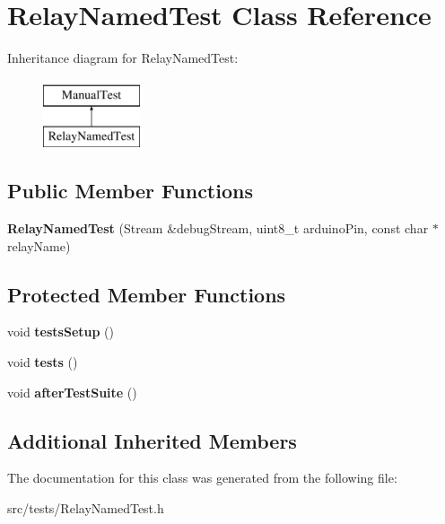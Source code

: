\hypertarget{class_relay_named_test}{}\section{Relay\+Named\+Test Class Reference}
\label{class_relay_named_test}
Inheritance diagram for Relay\+Named\+Test\+:\begin{figure}[H]
\begin{center}
\leavevmode
\includegraphics[height=2.000000cm]{class_relay_named_test}
\end{center}
\end{figure}
\subsection*{Public Member Functions}
\begin{DoxyCompactItemize}
\item 
\mbox{\label{class_relay_named_test_a6d38b8013435f4ac48c69ea7453491d3}} 
{\bfseries Relay\+Named\+Test} (Stream \&debug\+Stream, uint8\+\_\+t arduino\+Pin, const char $\ast$relay\+Name)
\end{DoxyCompactItemize}
\subsection*{Protected Member Functions}
\begin{DoxyCompactItemize}
\item 
\mbox{\label{class_relay_named_test_a40838e4025039d18b1d05f2d6d9613e8}} 
void {\bfseries tests\+Setup} ()
\item 
\mbox{\label{class_relay_named_test_af4b0f4ec6ba0f8e1434221dfc401c823}} 
void {\bfseries tests} ()
\item 
\mbox{\label{class_relay_named_test_af44928bffbb1d2733f12569dff36e3a1}} 
void {\bfseries after\+Test\+Suite} ()
\end{DoxyCompactItemize}
\subsection*{Additional Inherited Members}


The documentation for this class was generated from the following file\+:\begin{DoxyCompactItemize}
\item 
src/tests/Relay\+Named\+Test.\+h\end{DoxyCompactItemize}
